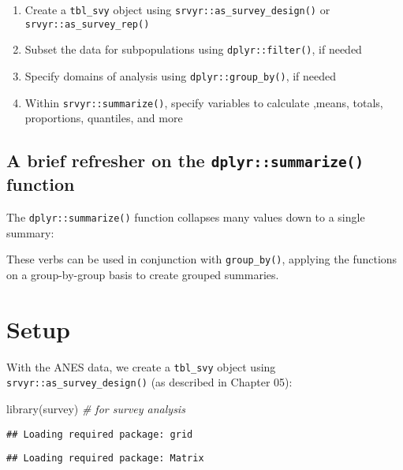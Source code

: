 \documentclass[
]{krantz}
\makeatletter
\newenvironment{Shaded}{\begin{snugshade}}{\end{snugshade}}
\newcommand{\CommentTok}[1]{\textcolor[rgb]{0.37,0.37,0.37}{\textit{#1}}}
\newcommand{\FunctionTok}[1]{\textcolor[rgb]{0,0,0}{#1}}
\newcommand{\NormalTok}[1]{#1}
\providecommand{\tightlist}{%
  \setlength{\itemsep}{0pt}\setlength{\parskip}{0pt}}
\newenvironment{kframe}{%
\medskip{}
\setlength{\fboxsep}{.8em}
 \def\at@end@of@kframe{}%
 \ifinner\ifhmode%
  \def\at@end@of@kframe{\end{minipage}}%
  \begin{minipage}{\columnwidth}%
 \fi\fi%
 \def\FrameCommand##1{\hskip\@totalleftmargin \hskip-\fboxsep
 \colorbox{shadecolor}{##1}\hskip-\fboxsep
     \hskip-\linewidth \hskip-\@totalleftmargin \hskip\columnwidth}%
 \MakeFramed {\advance\hsize-\width
   \@totalleftmargin\z@ \linewidth\hsize
   \@setminipage}}%
 {\par\unskip\endMakeFramed%
 \at@end@of@kframe}
\renewenvironment{Shaded}{\begin{kframe}}{\end{kframe}}
\makeatother
\begin{document}
\begin{enumerate}
\def\labelenumi{\arabic{enumi}.}
\tightlist
\item
  Create a \texttt{tbl\_svy} object using \texttt{srvyr::as\_survey\_design()} or \texttt{srvyr::as\_survey\_rep()}
\item
  Subset the data for subpopulations using \texttt{dplyr::filter()}, if needed
\item
  Specify domains of analysis using \texttt{dplyr::group\_by()}, if needed
\item
  Within \texttt{srvyr::summarize()}, specify variables to calculate ,means, totals, proportions, quantiles, and more
\end{enumerate}

\hypertarget{a-brief-refresher-on-the-dplyrsummarize-function}{%
\subsection{\texorpdfstring{A brief refresher on the \texttt{dplyr::summarize()} function}{A brief refresher on the dplyr::summarize() function}}\label{a-brief-refresher-on-the-dplyrsummarize-function}}

The \texttt{dplyr::summarize()} function collapses many values down to a single summary:

These verbs can be used in conjunction with \texttt{group\_by()}, applying the functions on a group-by-group basis to create grouped summaries.

\hypertarget{setup}{%
\section{Setup}\label{setup}}

With the ANES data, we create a \texttt{tbl\_svy} object using \texttt{srvyr::as\_survey\_design()} (as described in Chapter 05):

\begin{Shaded}
\begin{Highlighting}[]
\FunctionTok{library}\NormalTok{(survey) }\CommentTok{\# for survey analysis}
\end{Highlighting}
\end{Shaded}

\begin{verbatim}
## Loading required package: grid
\end{verbatim}

\begin{verbatim}
## Loading required package: Matrix
\end{verbatim}
\end{document}
